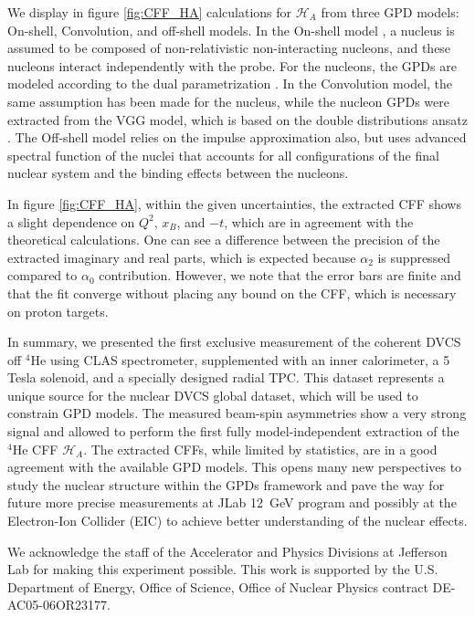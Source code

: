 \documentclass[nofootinbib,twocolumn,showpacs,prl,superscriptaddress,secnumarabic,amssymb,nobibnotes,aps,floatfix]{revtex4}
\begin{document}
We display in figure \ref{fig:CFF_HA} calculations for $\mathcal{H}_A$ from 
three GPD models: On-shell, Convolution, and off-shell models. In the On-shell 
model \cite{Vadim_priv}, a nucleus is assumed to be composed of 
non-relativistic non-interacting nucleons, and these nucleons interact 
independently with the probe. For the nucleons, the GPDs are modeled according 
to the dual parametrization \cite{Guzey:2006xi}. In the Convolution model, the 
same assumption has been made for the nucleus, while the nucleon GPDs were 
extracted from the VGG model, which is based on the double distributions ansatz 
\cite{DD_model}. The Off-shell model \cite{GonzalezHernandez:2012jv} relies on 
the impulse approximation also, but uses advanced spectral function of the 
nuclei that accounts for all configurations of the final nuclear system and the 
binding effects between the nucleons.

In figure \ref{fig:CFF_HA}, within the given uncertainties, the extracted CFF 
shows a slight dependence on $Q^{2}$, $x_B$, and $-t$, which are in agreement 
with the theoretical calculations. One can see a difference between the 
precision of the extracted imaginary and real parts, which is expected because 
$\alpha_2$ is suppressed compared to $\alpha_0$ contribution. However, we note 
that the error bars are finite and that the fit converge without placing any 
bound on the CFF, which is necessary on proton targets.


In summary, we presented the first exclusive measurement of the coherent DVCS 
off $^4$He using CLAS spectrometer, supplemented with an inner calorimeter, a 5 
Tesla solenoid, and a specially designed radial TPC. This dataset represents a 
unique source for the nuclear DVCS global dataset, which will be used to 
constrain GPD models. The measured beam-spin asymmetries show a very strong 
signal and allowed to perform the first fully model-independent extraction of 
the $^4$He CFF $\mathcal{H}_A$. The extracted CFFs, while limited by 
statistics, are in a good agreement with the available GPD models. This opens 
many new perspectives to study the nuclear structure within the GPDs framework 
and pave the way for future more precise measurements at JLab 12~GeV program 
and possibly at the Electron-Ion Collider (EIC) to achieve better understanding 
of the nuclear effects.


We acknowledge the staff of the Accelerator and Physics Divisions at Jefferson 
Lab for making this experiment possible. This work is supported by the U.S.  
Department of Energy, Office of Science, Office of Nuclear Physics contract 
DE-AC05-06OR23177.
\end{document}
